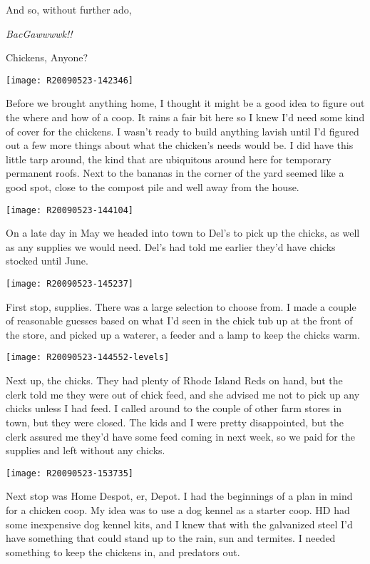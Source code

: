 And so, without further ado, 

{\Large {\em BacGawwwwk!!}}
\newpage

\vspace*{3in}
\begin{center}
\Huge{Chickens, Anyone?}
\end{center}
\newpage

\pagestyle{plain}

\texttt{[image: R20090523-142346]}

Before we brought anything home, I thought it might be a good idea to
figure out the where and how of a coop. It rains a fair bit here so I
knew I'd need some kind of cover for the chickens. I wasn't ready to
build anything lavish until I'd figured out a few more things about what
the chicken's needs would be. I did have this little tarp around, the
kind that are ubiquitous around here for temporary permanent roofs. Next
to the bananas in the corner of the yard seemed like a good spot, close
to the compost pile and well away from the house. 
\newpage

\texttt{[image: R20090523-144104]}

On a late day in May we headed into town to Del's to pick up the chicks,
as well as any supplies we would need.  Del's had told me earlier they'd
have chicks stocked until June. 
\newpage

\texttt{[image: R20090523-145237]}

First stop, supplies.  There was a large selection to choose from.  I
made a couple of reasonable guesses based on what I'd seen in the chick
tub up at the front of the store, and picked up a waterer, a feeder and
a lamp to keep the chicks warm. 
\newpage

\texttt{[image: R20090523-144552-levels]}

Next up, the chicks.  They had plenty of Rhode Island Reds on hand, but
the clerk told me they were out of chick feed, and she advised me not to
pick up any chicks unless I had feed.  I called around to the couple of
other farm stores in town, but they were closed.  The kids and I were
pretty disappointed, but the clerk assured me they'd have some feed
coming in next week, so we paid for the supplies and left without any
chicks. 
\newpage

\texttt{[image: R20090523-153735]}

Next stop was Home Despot, er, Depot.  I had the beginnings of a plan in
mind for a chicken coop.  My idea was to use a dog kennel as a starter
coop.  HD had some inexpensive dog kennel kits, and I knew that with the
galvanized steel I'd have something that could stand up to the rain, sun
and termites.  I needed something to keep the chickens in, and predators
out. 
\newpage

